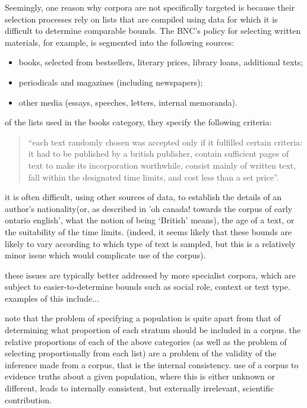 Seemingly, one reason why corpora are not specifically targeted is because their selection processes rely on lists that are compiled using data for which it is difficult to determine comparable bounds.  The BNC's policy for selecting written materials, for example, is segmented into the following sources:

\begin{itemize}
 \item books, selected from bestsellers, literary prices, library loans, additional texts;
 \item periodicals and magazines (including newspapers);
 \item other media (essays, speeches, letters, internal memoranda).
\end{itemize}

of the lists used in the books category, they specify the following criteria:

\begin{quotation}
``each text randomly chosen was accepted only if it fulfilled certain criteria: it had to be published by a british publisher, contain sufficient pages of text to make its incorporation worthwhile, consist mainly of written text, fall within the designated time limits, and cost less than a set price''.
\end{quotation}

it is often difficult, using other sources of data, to establish the details of an author's nationality(or, as described in 'oh canada! towards the corpus of early ontario english', what the notion of being `British' means), the age of a text, or the suitability of the time limits.  (indeed, it seems likely that these bounds are likely to vary according to which type of text is sampled, but this is a relatively minor issue which would complicate use of the corpus).

these issues are typically better addressed by more specialist corpora, which are subject to easier-to-determine bounds such as social role, context or text type.  examples of this include...


note that the problem of specifying a population is quite apart from that of determining what proportion of each stratum should be included in a corpus.  the relative proportions of each of the above categories (as well as the problem of selecting proportionally from each list) are a problem of the validity of the inference made from a corpus, that is the internal consistency.  use of a corpus to evidence truths about a given population, where this is either unknown or different, leads to internally consistent, but externally irrelevant, scientific contribution.

